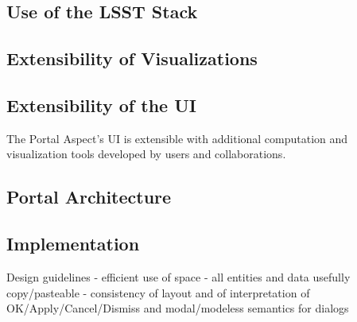 \subsection{Use of the LSST Stack}\label{use-of-the-lsst-stack}

\subsection{Extensibility of Visualizations}\label{extensibility-of-visualizations}

\subsection{Extensibility of the UI}\label{extensibility-of-the-ui}

The Portal Aspect's UI is extensible with additional computation and visualization tools developed by users and collaborations.

\subsection{Portal Architecture}

\subsection{Implementation}

Design guidelines
- efficient use of space
- all entities and data usefully copy/pasteable
- consistency of layout and of interpretation of OK/Apply/Cancel/Dismiss and modal/modeless semantics for dialogs

